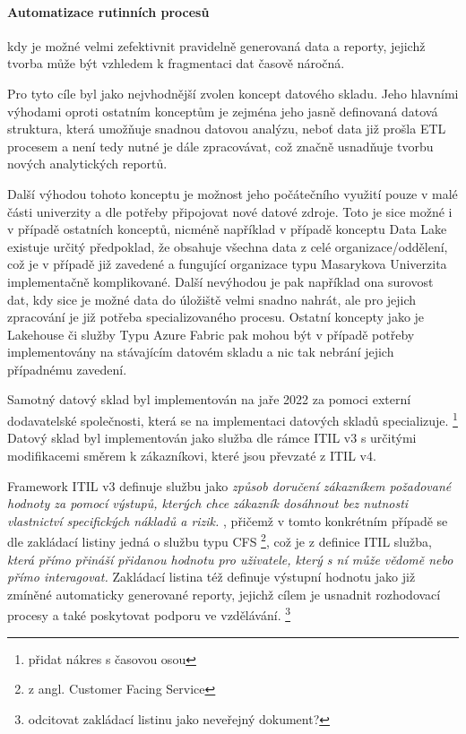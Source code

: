 \documentclass[
  digital,     %
  twoside,     %
  lof,         %
  lot,         %
]{fithesis4}
\begin{document}
\paragraph{Automatizace rutinních procesů} kdy je možné velmi zefektivnit pravidelně generovaná data a reporty, jejichž tvorba může být vzhledem k fragmentaci dat časově náročná. 

Pro tyto cíle byl jako nejvhodnější zvolen koncept datového skladu. Jeho hlavními výhodami oproti ostatním konceptům je zejména jeho jasně definovaná datová struktura, která umožňuje snadnou datovou analýzu, neboť data již prošla ETL procesem a není tedy nutné je dále zpracovávat, což značně usnadňuje tvorbu nových analytických reportů.

Další výhodou tohoto konceptu je možnost jeho počátečního využití pouze v malé části univerzity a dle potřeby připojovat nové datové zdroje. Toto je sice možné i v případě ostatních konceptů, nicméně například v případě konceptu Data Lake existuje určitý předpoklad, že obsahuje všechna data z celé organizace/oddělení, což je v případě již zavedené a fungující organizace typu Masarykova Univerzita implementačně komplikované. Další nevýhodou je pak například ona surovost dat, kdy sice je možné data do úložiště velmi snadno nahrát, ale pro jejich zpracování je již potřeba specializovaného procesu. Ostatní koncepty jako je Lakehouse či služby Typu Azure Fabric pak mohou být v případě potřeby implementovány na stávajícím datovém skladu a nic tak nebrání jejich případnému zavedení.

Samotný datový sklad byl implementován na jaře 2022 za pomoci externí dodavatelské společnosti, která se na implementaci datových skladů specializuje. \footnote{přidat nákres s časovou osou} Datový sklad byl implementován jako služba dle rámce ITIL v3 s určitými modifikacemi směrem k zákazníkovi, které jsou převzaté z ITIL v4. 

Framework ITIL v3 definuje službu jako \emph{způsob doručení zákazníkem požadované hodnoty za pomocí výstupů, kterých chce zákazník dosáhnout bez nutnosti vlastnictví specifických nákladů a rizik.} \parencite{SyFvQA11lk1OaIec}, přičemž v tomto konkrétním případě se dle zakládací listiny jedná o službu typu CFS \footnote{z angl. Customer Facing Service}, což je z definice ITIL služba, \emph{která přímo přináší přidanou hodnotu pro uživatele, který s ní může vědomě nebo přímo interagovat.}\parencite{SyFvQA11lk1OaIec} Zakládací listina též definuje výstupní hodnotu jako již zmíněné automaticky generované reporty, jejichž cílem je usnadnit rozhodovací procesy a také poskytovat podporu ve vzdělávání. \footnote{odcitovat zakládací listinu jako neveřejný dokument?}
\end{document}
